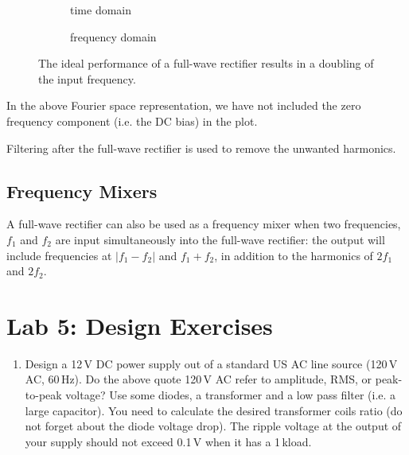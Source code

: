\documentclass{article}
\begin{document}
\begin{figure}
 \begin{center}
  \begin{subfigure}[b]{0.48\textwidth}
   \begin{center}
   \end{center}
   \caption{time domain}
  \end{subfigure}
  \begin{subfigure}[b]{0.48\textwidth}
   \begin{center}
   \end{center}
   \caption{frequency domain}
  \end{subfigure}
 \end{center}
\caption{The ideal performance of a full-wave rectifier results in a doubling of the input frequency.}
\label{fig:frequency-multiplier}
\end{figure}

In the above Fourier space representation, we have not included the zero frequency component (i.e. the DC bias) in the plot.

Filtering after the full-wave rectifier is used to remove the unwanted harmonics.

\subsection{Frequency Mixers}
A full-wave rectifier can also be used as a frequency mixer when two frequencies, $f_1$ and $f_2$ are input simultaneously into the full-wave rectifier: the output will include frequencies at $|f_1-f_2|$ and $f_1+f_2$, in addition to the harmonics of $2f_1$ and $2f_2$.


\pagebreak

\section{Lab 5: Design Exercises}
\begin{enumerate}
\item Design a 12\,V DC power supply out of a standard US AC line source (120\,V AC, 60\,Hz).  Do the above quote 120\,V AC refer to amplitude, RMS, or peak-to-peak voltage? Use some diodes, a transformer and a low pass filter (i.e. a large capacitor). You need to calculate the desired transformer coils ratio (do not forget about the diode voltage drop). The ripple voltage at the output of your supply should not exceed 0.1\,V when it has a 1\,k\Ohm load. 
\end{enumerate}
\end{document}
